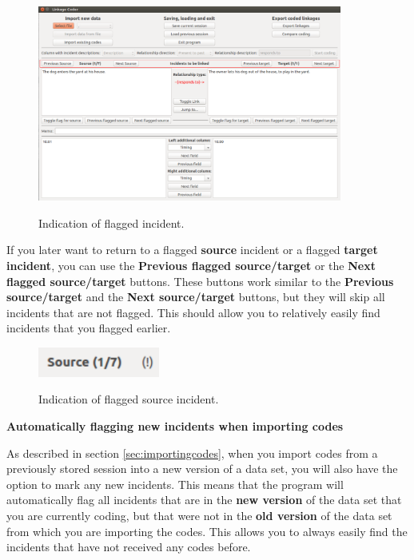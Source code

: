 \documentclass{memoir}
\begin{document}
\begin{figure}[h!]
  \centering
  \caption{Indication of flagged incident.}
  \includegraphics[width=100mm]{Screenshot_7.pdf}
  \label{fig:flagoptions}
\end{figure}

If you later want to return to a flagged \textbf{source} incident or a flagged \textbf{target incident}, you can use the \textbf{Previous flagged source/target} or the \textbf{Next flagged source/target} buttons. These buttons work similar to the \textbf{Previous source/target} and the \textbf{Next source/target} buttons, but they will skip all incidents that are not flagged. This should allow you to relatively easily find incidents that you flagged earlier.

\begin{figure}[h!]
  \centering
  \caption{Indication of flagged source incident.}
  \includegraphics[width=40mm]{Screenshot_9.pdf}
  \label{fig:flaggedincident}
\end{figure}


\begin{framed}
\textbf{Automatically flagging new incidents when importing codes}
  
  As described in section \ref{sec:importingcodes}, when you import codes from a previously stored session into a new version of a data set, you will also have the option to mark any new incidents. This means that the program will automatically flag all incidents that are in the \textbf{new version} of the data set that you are currently coding, but that were not in the \textbf{old version} of the data set from which you are importing the codes. This allows you to always easily find the incidents that have not received any codes before. 
\end{framed}
\end{document}
